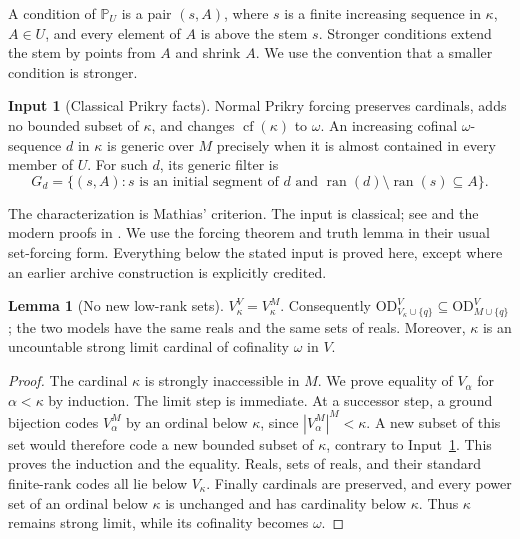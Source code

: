 \documentclass[11pt,letterpaper]{article}
\theoremstyle{definition}
\newtheorem{lemma}[definition]{Lemma}
\newtheorem{inputthm}{Input}
\numberwithin{equation}{section}
\newcommand{\OD}{\mathrm{OD}}
\newcommand{\cf}{\operatorname{cf}}
\newcommand{\ran}{\operatorname{ran}}
\newcommand{\PP}{\mathbb P}
\newcommand{\ODg}{\OD_{M\cup\{q\}}^{V}}
\newcommand{\ODlow}{\OD_{V_\kappa\cup\{q\}}^{V}}
\begin{document}
A condition of $\PP_U$ is a pair $(s,A)$, where $s$ is a finite increasing
sequence in $\kappa$, $A\in U$, and every element of $A$ is above the stem
$s$. Stronger conditions extend the stem by points from $A$ and shrink
$A$. We use the convention that a smaller condition is stronger.

\begin{inputthm}[Classical Prikry facts]\label{input:prikry}
Normal Prikry forcing preserves cardinals, adds no bounded subset of
$\kappa$, and changes $\cf(\kappa)$ to $\omega$. An increasing cofinal
$\omega$-sequence $d$ in $\kappa$ is generic over $M$ precisely when it is
almost contained in every member of $U$. For such $d$, its generic filter is
\[
 G_d=\{(s,A):s\text{ is an initial segment of }d
                  \text{ and }\ran(d)\setminus\ran(s)\subseteq A\}.
\]
\end{inputthm}

The characterization is Mathias' criterion. The input is classical; see
\cite{mathias} and the modern proofs in \cite[Section 3, especially
Corollary 3.15 and Theorem 3.17]{benhamou}. We use the forcing theorem and
truth lemma in their usual set-forcing form. Everything below the stated
input is proved here, except where an earlier archive construction is
explicitly credited.

\begin{lemma}[No new low-rank sets]\label{lem:lowrank}
$V_\kappa^V=V_\kappa^M$. Consequently $\ODlow\subseteq\ODg$; the two
models have the same reals and the same sets of reals. Moreover, $\kappa$
is an uncountable strong limit cardinal of cofinality $\omega$ in $V$.
\end{lemma}

\begin{proof}
The cardinal $\kappa$ is strongly inaccessible in $M$. We prove equality
of $V_\alpha$ for $\alpha<\kappa$ by induction. The limit step is immediate.
At a successor step, a ground bijection codes $V_\alpha^M$ by an ordinal
below $\kappa$, since $|V_\alpha^M|^M<\kappa$. A new subset of this set
would therefore code a new bounded subset of $\kappa$, contrary to
Input~\ref{input:prikry}. This proves the induction and the equality.
Reals, sets of reals, and their standard finite-rank codes all lie below
$V_\kappa$. Finally cardinals are preserved, and every power set of an
ordinal below $\kappa$ is unchanged and has cardinality below $\kappa$.
Thus $\kappa$ remains strong limit, while its cofinality becomes $\omega$.
\end{proof}
\end{document}
